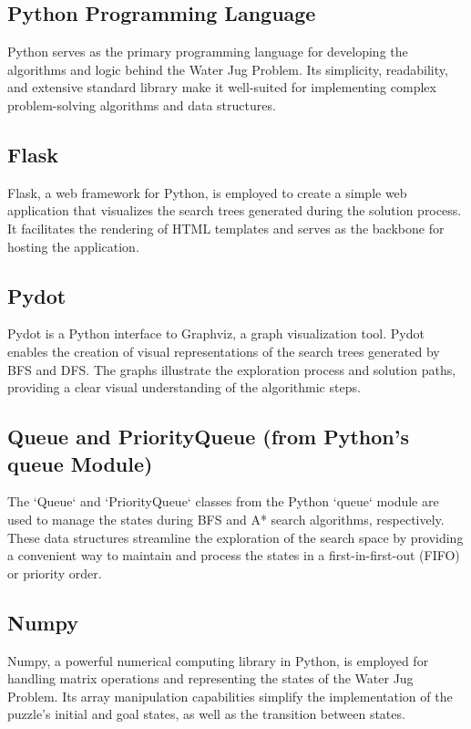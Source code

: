 \documentclass[12pt]{article}
\begin{document}
\subsection*{Python Programming Language}

Python serves as the primary programming language for developing the algorithms and logic behind the Water Jug Problem. Its simplicity, readability, and extensive standard library make it well-suited for implementing complex problem-solving algorithms and data structures.

\subsection*{Flask}

Flask, a web framework for Python, is employed to create a simple web application that visualizes the search trees generated during the solution process. It facilitates the rendering of HTML templates and serves as the backbone for hosting the application.

\subsection*{Pydot}

Pydot is a Python interface to Graphviz, a graph visualization tool. Pydot enables the creation of visual representations of the search trees generated by BFS and DFS. The graphs illustrate the exploration process and solution paths, providing a clear visual understanding of the algorithmic steps.

\subsection*{Queue and PriorityQueue (from Python's queue Module)}

The `Queue` and `PriorityQueue` classes from the Python `queue` module are used to manage the states during BFS and A* search algorithms, respectively. These data structures streamline the exploration of the search space by providing a convenient way to maintain and process the states in a first-in-first-out (FIFO) or priority order.

\subsection*{Numpy}

Numpy, a powerful numerical computing library in Python, is employed for handling matrix operations and representing the states of the Water Jug Problem. Its array manipulation capabilities simplify the implementation of the puzzle's initial and goal states, as well as the transition between states.
\end{document}
